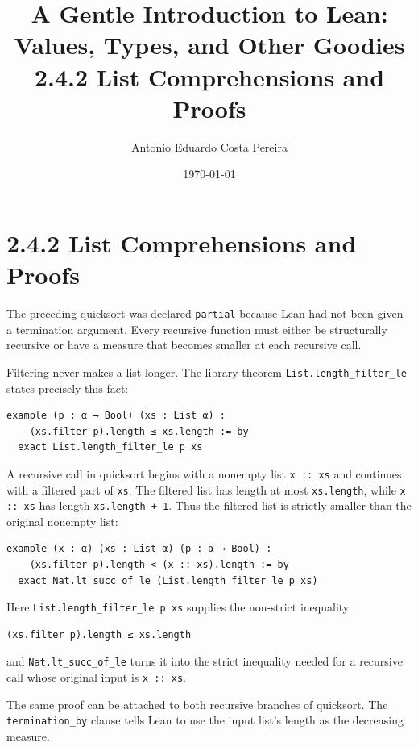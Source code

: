 \documentclass[11pt]{article}
\author{Antonio Eduardo Costa Pereira }
\date{\today}
\title{A Gentle Introduction to Lean: Values, Types, and Other Goodies\\\medskip
\large 2.4.2 List Comprehensions and Proofs}
\begin{document}
\maketitle
\tableofcontents

\section{2.4.2 List Comprehensions and Proofs}
\label{sec:org794b53e}

The preceding quicksort was declared \texttt{partial} because Lean had not been given
a termination argument.  Every recursive function must either be structurally
recursive or have a measure that becomes smaller at each recursive call.

Filtering never makes a list longer.  The library theorem
\texttt{List.length\_filter\_le} states precisely this fact:

\begin{verbatim}
example (p : α → Bool) (xs : List α) :
    (xs.filter p).length ≤ xs.length := by
  exact List.length_filter_le p xs
\end{verbatim}

A recursive call in quicksort begins with a nonempty list \texttt{x :: xs} and
continues with a filtered part of \texttt{xs}.  The filtered list has length at most
\texttt{xs.length}, while \texttt{x :: xs} has length \texttt{xs.length + 1}.  Thus the filtered
list is strictly smaller than the original nonempty list:

\begin{verbatim}
example (x : α) (xs : List α) (p : α → Bool) :
    (xs.filter p).length < (x :: xs).length := by
  exact Nat.lt_succ_of_le (List.length_filter_le p xs)
\end{verbatim}

Here \texttt{List.length\_filter\_le p xs} supplies the non-strict inequality

\begin{verbatim}
(xs.filter p).length ≤ xs.length
\end{verbatim}

and \texttt{Nat.lt\_succ\_of\_le} turns it into the strict inequality needed for a
recursive call whose original input is \texttt{x :: xs}.

The same proof can be attached to both recursive branches of quicksort.  The
\texttt{termination\_by} clause tells Lean to use the input list's length as the
decreasing measure.
\end{document}
